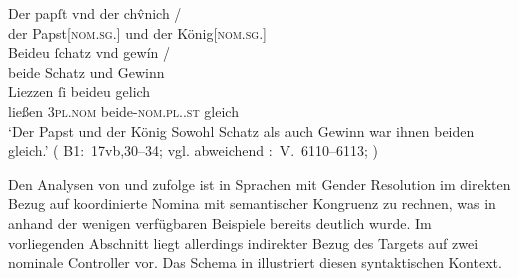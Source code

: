 \begin{exe}
\ex\label{ex:papstkoenig5} %
	\gll Der papſt vnd der chv̂nich {/} \\
		der Papst[\textsc{nom.sg.\MascM}] und der König[\textsc{nom.sg.\MascM}]
		\\
	\textelp{}
	\gll Beideu ſchatz vnd gewín {/} \\
		beide Schatz und Gewinn \\
	\gll Liezzen ſi beideu gelich \\
		ließen \textsc{3pl\subM.nom} beide-\textsc{nom.pl.\NeutM.st} gleich \\
	\trans `Der Papst und der König
		\textelp{}
		Sowohl Schatz als auch Gewinn war ihnen beiden gleich.'
		(%
			B1:~17vb,30--34; vgl. abweichend
			\KC:~V.~6110--6113;
			\cite[202]{schroeder1895}%
		)
\end{exe}

Den Analysen von \citet{wechsler2009} und \citet{wechslerzlatic2003} zufolge
ist in Sprachen mit Gender Resolution im direkten Bezug auf koordinierte Nomina
mit semantischer Kongruenz zu rechnen, was in 
anhand der wenigen verfügbaren Beispiele bereits deutlich wurde. Im
vorliegenden Abschnitt liegt allerdings indirekter Bezug des Targets
 auf zwei nominale Controller vor. Das Schema in
 illustriert diesen syntaktischen Kontext.

